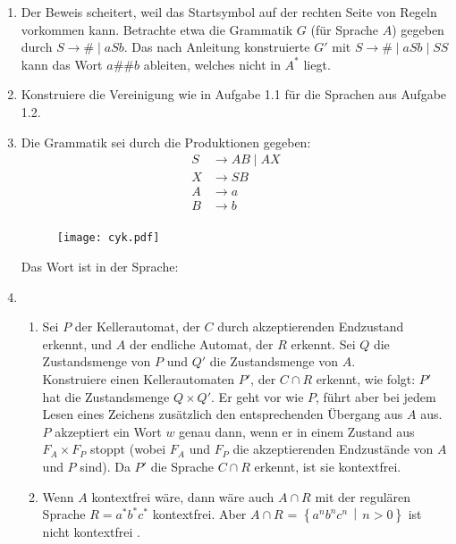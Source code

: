 \documentclass{article}
\newcommand{\menge}[2]{\ensuremath{\left\lbrace #1 \,\middle\vert\, #2 \right\rbrace}}
\newcommand{\harrypotter}{\Lightning}
\begin{document}
{\begin{enumerate}
\item Der Beweis scheitert, weil das Startsymbol auf der rechten Seite von Regeln vorkommen kann. Betrachte etwa die Grammatik $G$ (für Sprache $A$) gegeben durch $S \rightarrow \# \mid  aSb$. Das nach Anleitung konstruierte $G'$ mit $S \rightarrow \# \mid  aSb \mid  SS$ kann das Wort $a\#\#b$ ableiten, welches nicht in $A^*$ liegt.
\item Konstruiere die Vereinigung wie in Aufgabe 1.1 für die Sprachen aus Aufgabe 1.2.
\item Die Grammatik sei durch die Produktionen gegeben:
\begin{align*}
S&\rightarrow AB\mid AX\\
X&\rightarrow SB\\
A&\rightarrow a \\
B&\rightarrow b \\
\end{align*}
\begin{figure}
\centering
	\texttt{[image: cyk.pdf]}
\end{figure}
Das Wort ist in der Sprache:
\item \begin{enumerate}
	\item Sei $P$ der Kellerautomat, der $C$ durch akzeptierenden Endzustand erkennt, und $A$ der endliche Automat, der $R$ erkennt. Sei $Q$ die Zustandsmenge von $P$ und $Q'$ die Zustandsmenge von $A$. \\ Konstruiere einen Kellerautomaten $P'$, der $C \cap R$ erkennt, wie folgt: $P'$ hat die Zustandsmenge $Q \times Q'$. Er geht vor wie $P$, führt aber bei jedem Lesen eines Zeichens zusätzlich den entsprechenden Übergang aus $A$ aus. $P$ akzeptiert ein Wort $w$ genau dann, wenn er in einem Zustand aus $F_A \times F_P$ stoppt (wobei $F_A$ und $F_P$ die akzeptierenden Endzustände von $A$ und $P$ sind). Da $P'$ die Sprache $C \cap R$ erkennt, ist sie kontextfrei.
	\item Wenn $A$ kontextfrei wäre, dann wäre auch $A \cap R$ mit der regulären Sprache $R = a^*b^*c^*$ kontextfrei. Aber $A \cap R$ = $\menge{a^nb^nc^n}{n > 0}$ ist nicht kontextfrei \harrypotter.
\end{enumerate}
\end{enumerate}
}
\end{document}
